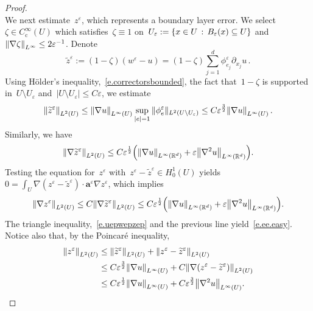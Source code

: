 \documentclass[11pt,twoside]{article} %
\numberwithin{equation}{section}
\theoremstyle{definition}
\let\originalleft\left
\let\originalright\right
\renewcommand{\left}{\mathopen{}\mathclose\bgroup\originalleft}
\renewcommand{\right}{\aftergroup\egroup\originalright}
\newcommand*{\Rd}{\ensuremath{\mathbb{R}^d}}
\newcommand{\eps}{\varepsilon}
\renewcommand*{\tilde}{\widetilde}
\newcommand{\ep}{\eps}
\renewcommand{\a}{\mathbf{a}}
\begin{document}
\begin{proof}
\begin{equation}
\end{equation}
We next estimate~$z^\ep$, which represents a boundary layer error. 
We select~$\zeta\in C^\infty_{\mathrm{c}}(U)$ which satisfies~$\zeta \equiv 1$ on~$U_{\ep}:= \left\{ x\in U\,:\, B_\ep(x) \subseteq U \right\}$ and~$\left\| \nabla \zeta \right\|_{L^\infty} \leq 2\ep^{-1}$.
Denote
\begin{equation*}
\tilde{z}^\ep
:= 
(1-\zeta)(w^\ep-u) 
= 
(1-\zeta) \sum_{j=1}^d \phi_{e_j}^\ep  \partial_{x_j}u \,.
\end{equation*}
Using H\"older's inequality,~\eqref{e.correctorsbounded}, the fact that~$1-\zeta$ is supported in~$U \setminus U_\ep$ and~$|U\setminus U_\ep| \leq C\ep$, we estimate
\begin{equation*}
\left\| \tilde{z}^\ep \right\|_{L^2(U)} 
\leq 
\left\| \nabla u \right\|_{L^\infty(U)} 
\sup_{|e| =1} \| \phi^\ep_e \|_{L^2(U\setminus U_\ep)}
\leq
C\ep^{\frac32} \left\| \nabla u \right\|_{L^\infty(U)}
\,.
\end{equation*}
Similarly, we have
\begin{equation*}
\left\| \nabla \tilde{z}^\ep \right\|_{{L}^2(U)} 
\leq 
C\ep^{\frac12} \left( \left\| \nabla u \right\|_{L^\infty(\Rd)} 
+
\ep \left\| \nabla^2 u \right\|_{L^\infty(\Rd)} \right). 
\end{equation*}
Testing the equation for~$z^\ep$ with~$z^\ep - \tilde{z}^\ep \in H^1_0(U)$ yields
$0 = \int_U \nabla (z^\ep - \tilde{z}^\ep) \cdot \a^\ep \nabla z^\ep$, 
which implies 
\begin{equation*}
\left\| \nabla z^\ep \right\|_{{L}^2(U)} 
\leq
C\left\| \nabla \tilde{z}^\ep \right\|_{{L}^2(U)}
\leq 
C\ep^{\frac12} \left( \left\| \nabla u \right\|_{L^\infty(\Rd)} 
+
\ep \left\| \nabla^2 u \right\|_{L^\infty(\Rd)} \right).
\end{equation*}
The triangle inequality,~\eqref{e.uepwepzep} and the previous line yield~\eqref{e.ee.easy}. Notice also that, by the Poincar\'e inequality, 
\begin{align}
\label{e.crude}
\left\| z^\ep\right\|_{L^2(U)}
&
\leq 
\left\| \tilde{z}^\ep \right\|_{L^2(U)} 
+ \left\| z^\ep - \tilde{z}^\ep\right\|_{L^2(U)}
\notag \\ & 
\leq C\ep^{\frac32} \left\| \nabla u \right\|_{L^\infty(U)}
+ C \left\| \nabla (z^\ep - \tilde{z}^\ep)\right\|_{L^2(U)}
\notag \\ &  
\leq
C\ep^{\frac12} \left\| \nabla u \right\|_{L^\infty(U)} 
+
C\ep^{\frac 32} \left\| \nabla^2 u \right\|_{L^\infty(U)}.
\end{align}

\end{proof}
\end{document}
